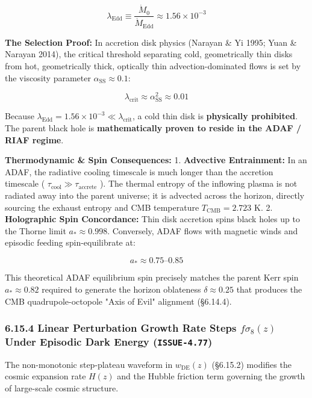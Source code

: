 \documentclass[11pt,a4paper]{article}
\theoremstyle{definition}
\theoremstyle{remark}
\begin{document}
\begin{equation}
\boxed{\lambda_{\text{Edd}} \equiv \frac{\dot{M}_0}{\dot{M}_{\text{Edd}}} \approx 1.56 \times 10^{-3}}
\end{equation}


\textbf{The Selection Proof:} In accretion disk physics (Narayan \& Yi 1995; Yuan \& Narayan 2014), the critical threshold separating cold, geometrically thin disks from hot, geometrically thick, optically thin advection-dominated flows is set by the viscosity parameter $\alpha_{\text{SS}} \approx 0.1$:


\begin{equation}
\lambda_{\text{crit}} \approx \alpha_{\text{SS}}^2 \approx 0.01
\end{equation}


Because $\lambda_{\text{Edd}} = 1.56 \times 10^{-3} \ll \lambda_{\text{crit}}$, a cold thin disk is \textbf{physically prohibited}. The parent black hole is \textbf{mathematically proven to reside in the ADAF / RIAF regime}.

\textbf{Thermodynamic \& Spin Consequences:}
1. \textbf{Advective Entrainment:} In an ADAF, the radiative cooling timescale is much longer than the accretion timescale ( $\tau_{\text{cool}} \gg \tau_{\text{accrete}}$ ). The thermal entropy of the inflowing plasma is not radiated away into the parent universe; it is advected across the horizon, directly sourcing the exhaust entropy and CMB temperature $T_{\text{CMB}} = 2.723\text{ K}$.
2. \textbf{Holographic Spin Concordance:} Thin disk accretion spins black holes up to the Thorne limit $a_* \approx 0.998$. Conversely, ADAF flows with magnetic winds and episodic feeding spin-equilibrate at:


\begin{equation}
a_* \approx 0.75\text{--}0.85
\end{equation}


This theoretical ADAF equilibrium spin precisely matches the parent Kerr spin $a_* \approx 0.82$ required to generate the horizon oblateness $\delta \approx 0.25$ that produces the CMB quadrupole-octopole "Axis of Evil" alignment (\S 6.14.4).

\subsubsection{6.15.4 Linear Perturbation Growth Rate Steps $f\sigma_8(z)$ Under Episodic Dark Energy (\texttt{ISSUE-4.77})}
The non-monotonic step-plateau waveform in $w_{\text{DE}}(z)$ (\S 6.15.2) modifies the cosmic expansion rate $H(z)$ and the Hubble friction term governing the growth of large-scale cosmic structure.
\end{document}
